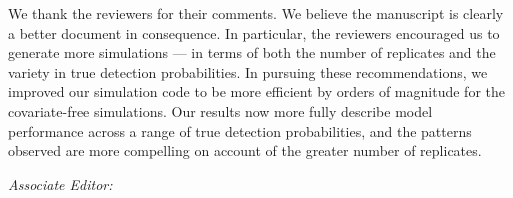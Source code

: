 \documentclass[12pt]{article}
\renewenvironment{quote}  %
              {\list{}{\rightmargin\leftmargin}\normalfont%
               \item\relax}
              {\endlist}
\begin{document}
\begin{quote}
We thank the reviewers for their comments.
We believe the manuscript is clearly a better document in consequence.
In particular, the reviewers encouraged us to generate more simulations --- in terms of both the number of replicates and the variety in true detection probabilities.
In pursuing these recommendations, we improved our simulation code to be more efficient by orders of magnitude for the covariate-free simulations.
Our results now more fully describe model performance across a range of true detection probabilities, and the patterns observed are more compelling on account of the greater number of replicates.
\end{quote}

\newpage

\itshape
Associate Editor:
\end{document}

